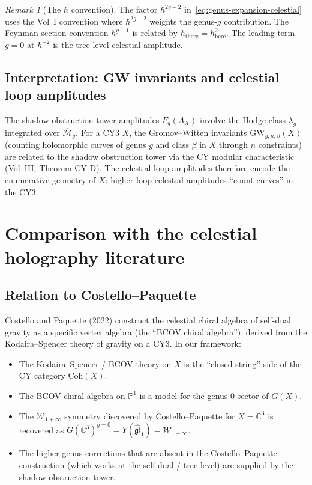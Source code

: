 \documentclass[11pt]{article}
\theoremstyle{definition}
\theoremstyle{remark}
\newtheorem{remark}[theorem]{Remark}
\newcommand{\cM}{\mathcal{M}}
\newcommand{\cW}{\mathcal{W}}
\newcommand{\Coh}{\mathrm{Coh}}
\begin{document}
\begin{remark}[The $\hbar$ convention]
\label{rem:hbar-convention}
The factor $\hbar^{2g-2}$ in~\eqref{eq:genus-expansion-celestial}
uses the Vol~I convention where $\hbar^{2g-2}$ weights the genus-$g$
contribution. The Feynman-section convention $\hbar^{g-1}$ is
related by $\hbar_{\mathrm{there}} = \hbar_{\mathrm{here}}^2$.
The leading term $g=0$ at $\hbar^{-2}$ is the tree-level celestial
amplitude.
\end{remark}

\subsection{Interpretation: GW invariants and celestial loop amplitudes}

The shadow obstruction tower amplitudes $F_g(A_X)$ involve the Hodge class
$\lambda_g$ integrated over $\overline{\cM}_g$. For a CY3 $X$,
the Gromov--Witten invariants $\mathrm{GW}_{g,n,\beta}(X)$ (counting
holomorphic curves of genus $g$ and class $\beta$ in $X$ through
$n$ constraints) are related to the shadow obstruction tower via the CY modular
characteristic (Vol~III, Theorem CY-D). The celestial loop
amplitudes therefore encode the enumerative geometry of $X$:
higher-loop celestial amplitudes ``count curves'' in the CY3.

\section{Comparison with the celestial holography literature}
\label{sec:comparison}

\subsection{Relation to Costello--Paquette}

Costello and Paquette (2022) construct the celestial chiral algebra
of self-dual gravity as a specific vertex algebra (the ``BCOV
chiral algebra''), derived from the Kodaira--Spencer theory of
gravity on a CY3. In our framework:

\begin{itemize}
\item The Kodaira--Spencer / BCOV theory on $X$ is the
 ``closed-string'' side of the CY category $\Coh(X)$.
\item The BCOV chiral algebra on $\mathbb{P}^1$ is a model for the
 genus-0 sector of $G(X)$.
\item The $\cW_{1+\infty}$ symmetry discovered by Costello--Paquette
 for $X = \mathbb{C}^3$ is recovered as
 $G(\mathbb{C}^3)^{g=0} = Y(\widehat{\mathfrak{gl}}_1) =
 \cW_{1+\infty}$.
\item The higher-genus corrections that are absent in the
 Costello--Paquette construction (which works at the self-dual /
 tree level) are supplied by the shadow obstruction tower.
\end{itemize}
\end{document}
